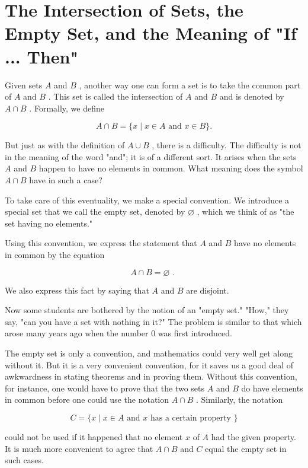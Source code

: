 \section*{The Intersection of Sets, the Empty Set, and the Meaning of "If ... Then"}

Given sets \(A\) and \(B\) , another way one can form a set is to take the common part of \(A\) and \(B\) . This set is called the intersection of \(A\) and \(B\) and is denoted by \(A \cap  B\) . Formally, we define

\[
A \cap  B = \{ x \mid  x \in  A\text{ and }x \in  B\} .
\]

But just as with the definition of \(A \cup  B\) , there is a difficulty. The difficulty is not in the meaning of the word "and"; it is of a different sort. It arises when the sets \(A\) and \(B\) happen to have no elements in common. What meaning does the symbol \(A \cap  B\) have in such a case?

To take care of this eventuality, we make a special convention. We introduce a special set that we call the empty set, denoted by \(\varnothing\) , which we think of as "the set having no elements."

Using this convention, we express the statement that \(A\) and \(B\) have no elements in common by the equation

\[
A \cap  B = \varnothing \text{ . }
\]

We also express this fact by saying that \(A\) and \(B\) are disjoint.

Now some students are bothered by the notion of an "empty set." "How," they say, "can you have a set with nothing in it?" The problem is similar to that which arose many years ago when the number 0 was first introduced.

The empty set is only a convention, and mathematics could very well get along without it. But it is a very convenient convention, for it saves us a good deal of awkwardness in stating theorems and in proving them. Without this convention, for instance, one would have to prove that the two sets \(A\) and \(B\) do have elements in common before one could use the notation \(A \cap  B\) . Similarly, the notation

\[
C = \{ x \mid  x \in  A\text{ and }x\text{ has a certain property }\}
\]

could not be used if it happened that no element \(x\) of \(A\) had the given property. It is much more convenient to agree that \(A \cap  B\) and \(C\) equal the empty set in such cases.

